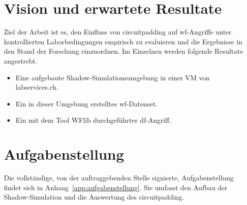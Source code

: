 \section{Vision und erwartete Resultate}

Ziel der Arbeit ist es, den Einfluss von \gls{circuitpadding} auf \gls{wf}-Angriffe unter kontrollierten Laborbedingungen empirisch zu evaluieren und die Ergebnisse in den Stand der Forschung einzuordnen.
Im Einzelnen werden folgende Resultate angestrebt.

\begin{itemize}
    \item Eine aufgebaute Shadow-Simulationsumgebung in einer VM von labservices.ch.
    \item Ein in dieser Umgebung erstelltes \gls{wf}-Datenset.
    \item Ein mit dem Tool WFlib durchgeführter \gls{df}-Angriff.
\end{itemize}

\section{Aufgabenstellung}

Die vollständige, von der auftraggebenden Stelle signierte, Aufgabenstellung findet sich in Anhang~\ref{app:aufgabenstellung}.
Sie umfasst den Aufbau der Shadow-Simulation und die Auswertung des \gls{circuitpadding}.
